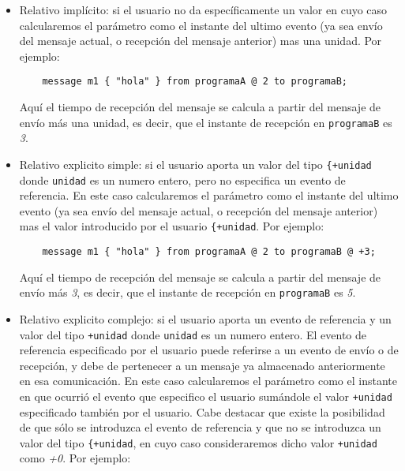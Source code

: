 \begin{itemize}
\item Relativo implícito: si el usuario no da específicamente un valor
  en cuyo caso calcularemos el parámetro como el instante del ultimo
  evento (ya sea envío del mensaje actual, o recepción del mensaje
  anterior) mas una unidad. Por ejemplo:

  \begin{lstlisting}
    message m1 { "hola" } from programaA @ 2 to programaB;
  \end{lstlisting}

  Aquí el tiempo de recepción del mensaje se calcula a partir del
  mensaje de envío más una unidad, es decir, que el instante de
  recepción en \lstinline{programaB} es \textit{3}.
\item Relativo explicito simple: si el usuario aporta un valor del
  tipo \lstinline{{+unidad} donde \lstinline{unidad} es un numero
  entero, pero no especifica un evento de referencia. En este caso
  calcularemos el parámetro como el instante del ultimo evento (ya
  sea envío del mensaje actual, o recepción del mensaje anterior)
  mas el valor introducido por el usuario \lstinline{{+unidad}. Por  
  ejemplo:
      
  \begin{lstlisting}
    message m1 { "hola" } from programaA @ 2 to programaB @ +3;
  \end{lstlisting}
      
  Aquí el tiempo de recepción del mensaje se calcula a partir del
  mensaje de envío más \textit{3}, es decir, que el instante de
  recepción en \lstinline{programaB} es \textit{5}.
      
\item Relativo explicito complejo: si el usuario aporta un evento de
  referencia y un valor del tipo \lstinline{+unidad} donde
  \lstinline{unidad} es un numero entero. El evento de referencia
  especificado por el usuario puede referirse a un evento de envío o
  de recepción, y debe de pertenecer a un mensaje ya almacenado
  anteriormente en esa comunicación. En este caso calcularemos el
  parámetro como el instante en que ocurrió el evento que especifico
  el usuario sumándole el valor \lstinline{+unidad} especificado
  también por el usuario. Cabe destacar que existe la posibilidad de
  que sólo se introduzca el evento de referencia y que no se
  introduzca un valor del tipo \lstinline{{+unidad}, en cuyo caso
  consideraremos dicho valor \lstinline{+unidad} como \textit{+0}. 
  Por ejemplo:


\end{itemize}
